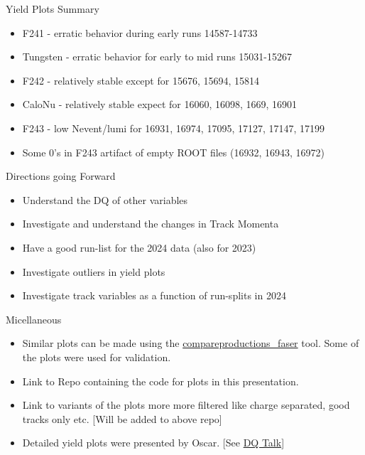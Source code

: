 \begin{frame}{Yield Plots Summary}
    \begin{itemize}
        \item F241 - erratic behavior  during early runs 14587-14733
        \item Tungsten - erratic behavior for early to mid runs 15031-15267
        \item F242 - relatively stable except for 15676, 15694, 15814
        \item CaloNu - relatively stable expect for 16060, 16098, 1669, 16901
        \item F243 - low Nevent/lumi for 16931, 16974, 17095, 17127, 17147, 17199
        \item Some 0's in F243 artifact of empty ROOT files (16932, 16943, 16972)
    \end{itemize}
\end{frame}
\begin{frame}{Directions going Forward}
    \begin{itemize}
        \item Understand the DQ of other variables
        \item Investigate and understand the changes in Track Momenta
        \item Have a good run-list for the 2024 data (also for 2023)
        \item Investigate outliers in yield plots
        \item Investigate track variables as a function of run-splits in 2024
    \end{itemize}
\end{frame}
\begin{frame}{Micellaneous}
    \begin{itemize}
        \item Similar plots can be made using the \href{https://gitlab.cern.ch/anburger/compareproductions_faser}{compareproductions\_faser} tool. Some of the plots were used for validation.
        \item Link to Repo containing the code for plots in this presentation.
        \item Link to variants of the plots more more filtered like charge separated, good tracks only etc. [Will be added to above repo]
        \item Detailed yield plots were presented by Oscar. [See \href{https://indico.cern.ch/event/1476946/contributions/6220240/attachments/2970435/5227381/DQ2024.pdf}{DQ Talk}]
    \end{itemize}
\end{frame}
